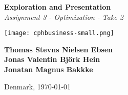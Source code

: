 \begin{titlepage}
    \begin{center}
        \vspace*{1cm}
        \linespread{1.5}

        \Huge
        \textbf{Exploration and Presentation}\\
        \Large
        \emph{Assignment 3 - Optimization - Take 2}

        
        \vfill

        \texttt{[image: cphbusiness-small.png]}

        \vfill

        \textbf{Thomas Stevns Nielsen Ebsen}\\
        \textbf{Jonas Valentin Björk Hein}\\
        \textbf{Jonatan Magnus Bakkke}

        \vspace{1.5cm}
        Denmark, \today

        \linespread{1}
    \end{center}
\end{titlepage}
